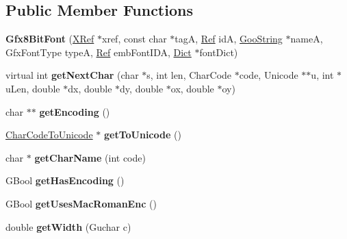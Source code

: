 \subsection*{Public Member Functions}
\begin{DoxyCompactItemize}
\item 
\mbox{\label{class_gfx8_bit_font_aaa8dfa0d1d4bd3f9c5effe1dbf23bb1a}} 
{\bfseries Gfx8\+Bit\+Font} (\hyperlink{class_x_ref}{X\+Ref} $\ast$xref, const char $\ast$tagA, \hyperlink{struct_ref}{Ref} idA, \hyperlink{class_goo_string}{Goo\+String} $\ast$nameA, Gfx\+Font\+Type typeA, \hyperlink{struct_ref}{Ref} emb\+Font\+I\+DA, \hyperlink{class_dict}{Dict} $\ast$font\+Dict)
\item 
\mbox{\label{class_gfx8_bit_font_a9202026d9764ef06f0e6c62667d88974}} 
virtual int {\bfseries get\+Next\+Char} (char $\ast$s, int len, Char\+Code $\ast$code, Unicode $\ast$$\ast$u, int $\ast$u\+Len, double $\ast$dx, double $\ast$dy, double $\ast$ox, double $\ast$oy)
\item 
\mbox{\label{class_gfx8_bit_font_ad05cb270c0b866d06e6eef3de49dd27a}} 
char $\ast$$\ast$ {\bfseries get\+Encoding} ()
\item 
\mbox{\label{class_gfx8_bit_font_a8ed8390630585c8b9f5f4de2b4e88300}} 
\hyperlink{class_char_code_to_unicode}{Char\+Code\+To\+Unicode} $\ast$ {\bfseries get\+To\+Unicode} ()
\item 
\mbox{\label{class_gfx8_bit_font_a6d7e45f755b44d96ea8ca12d09a2b8c1}} 
char $\ast$ {\bfseries get\+Char\+Name} (int code)
\item 
\mbox{\label{class_gfx8_bit_font_a7b74d860100c4ffbdd3ef09b9225f918}} 
G\+Bool {\bfseries get\+Has\+Encoding} ()
\item 
\mbox{\label{class_gfx8_bit_font_a7d2747fea71d4dee5abd3c2a6759ccee}} 
G\+Bool {\bfseries get\+Uses\+Mac\+Roman\+Enc} ()
\item 
\mbox{\label{class_gfx8_bit_font_abef1fa08704bd41f20f33d179b812c4f}} 
double {\bfseries get\+Width} (Guchar c)
\item 

\end{DoxyCompactItemize}
